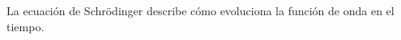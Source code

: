 \documentclass[preview]{standalone}
\begin{document}
\begin{center}
La ecuación de Schrödinger describe cómo evoluciona la función de onda en el tiempo.
\end{center}
\end{document}
